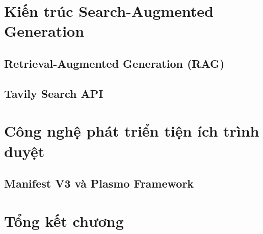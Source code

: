 \section{Kiến trúc Search-Augmented Generation}

\subsection{Retrieval-Augmented Generation (RAG)}

\subsection{Tavily Search API}

\section{Công nghệ phát triển tiện ích trình duyệt}

\subsection{Manifest V3 và Plasmo Framework}

\section{Tổng kết chương}
